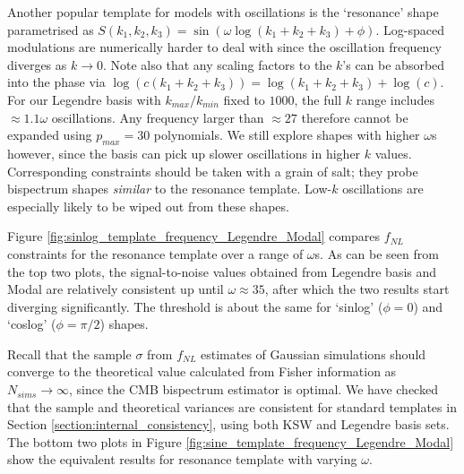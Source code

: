 Another popular template for models with oscillations is the `resonance' shape parametrised as $S(k_1, k_2, k_3) = \sin(\omega \log(k_1 + k_2 + k_3 ) + \phi)$. Log-spaced modulations are numerically harder to deal with since the oscillation frequency diverges as $k \rightarrow 0$. Note also that any scaling factors to the $k$'s can be absorbed into the phase via $\log(c(k_1 + k_2 + k_3)) = \log(k_1 + k_2 + k_3) + \log(c)$. For our Legendre basis with $k_{max}/k_{min}$ fixed to $1000$, the full $k$ range includes $\approx 1.1\omega$ oscillations. Any frequency larger than $\approx 27$ therefore cannot be expanded using $p_{max}=30$ polynomials. We still explore shapes with higher $\omega$s however, since the basis can pick up slower oscillations in higher $k$ values. Corresponding constraints should be taken with a grain of salt; they probe bispectrum shapes \textit{similar} to the resonance template. Low-$k$ oscillations are especially likely to be wiped out from these shapes.

Figure \ref{fig:sinlog_template_frequency_Legendre_Modal} compares $f_{NL}$ constraints for the resonance template over a range of $\omega$s. As can be seen from the top two plots, the signal-to-noise values obtained from Legendre basis and Modal are relatively consistent up until $\omega \approx 35$, after which the two results start diverging significantly. The threshold is about the same for `sinlog' ($\phi = 0$) and `coslog' ($\phi=\pi/2$) shapes.

Recall that the sample $\sigma$ from $f_{NL}$ estimates of Gaussian simulations should converge to the theoretical value calculated from Fisher information as $N_{sims}\rightarrow\infty$, since the CMB bispectrum estimator is optimal. We have checked that the sample and theoretical variances are consistent for standard templates in Section \ref{section:internal_consistency}, using both KSW and Legendre basis sets. The bottom two plots in Figure \ref{fig:sine_template_frequency_Legendre_Modal} show the equivalent results for resonance template with varying $\omega$.

